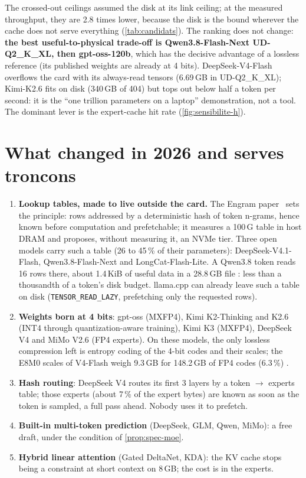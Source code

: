 \noindent The crossed-out ceilings assumed the disk at its link ceiling; at the measured throughput, they are 2.8 times lower, because the disk is the bound wherever the cache does not serve everything (\cref{tab:candidats}). The ranking does not change: \textbf{the best useful-to-physical trade-off is Qwen3.8-Flash-Next UD-Q2\_K\_XL, then gpt-oss-120b}, which has the decisive advantage of a lossless reference (its published weights are already at 4 bits). DeepSeek-V4-Flash overflows the card with its always-read tensors (6.69\,GB in UD-Q2\_K\_XL); Kimi-K2.6 fits on disk (340\,GB of 404) but tops out below half a token per second: it is the \enquote{one trillion parameters on a laptop} demonstration, not a tool. The dominant lever is the expert-cache hit rate (\cref{fig:sensibilite-h}).

\section{What changed in 2026 and serves troncons}

\begin{enumerate}
\item \textbf{Lookup tables, made to live outside the card.} The Engram paper~\cite{engram2026} sets the principle: rows addressed by a deterministic hash of token n-grams, hence known before computation and prefetchable; it measures a 100\,G table in host DRAM and proposes, without measuring it, an NVMe tier. Three open models carry such a table (26 to 45\,\% of their parameters): DeepSeek-V4.1-Flash, Qwen3.8-Flash-Next and LongCat-Flash-Lite. A Qwen3.8 token reads 16 rows there, about 1.4\,KiB of useful data in a 28.8\,GB file \calc: less than a thousandth of a token's disk budget. llama.cpp can already leave such a table on disk (\texttt{TENSOR\_READ\_LAZY}, prefetching only the requested rows).
\item \textbf{Weights born at 4 bits}: gpt-oss (MXFP4), Kimi K2-Thinking and K2.6 (INT4 through quantization-aware training), Kimi K3 (MXFP4), DeepSeek V4 and MiMo V2.6 (FP4 experts). On these models, the only lossless compression left is entropy coding of the 4-bit codes and their scales; the E8M0 scales of V4-Flash weigh 9.3\,GB for 148.2\,GB of FP4 codes (6.3\,\%) \mes.
\item \textbf{Hash routing}: DeepSeek V4 routes its first 3 layers by a token $\to$ experts table; those experts (about 7\,\% of the expert bytes) are known as soon as the token is sampled, a full pass ahead. Nobody uses it to prefetch.
\item \textbf{Built-in multi-token prediction} (DeepSeek, GLM, Qwen, MiMo): a free draft, under the condition of \cref{prop:spec-moe}.
\item \textbf{Hybrid linear attention} (Gated DeltaNet, KDA): the KV cache stops being a constraint at short context on 8\,GB; the cost is in the experts.
\end{enumerate}

